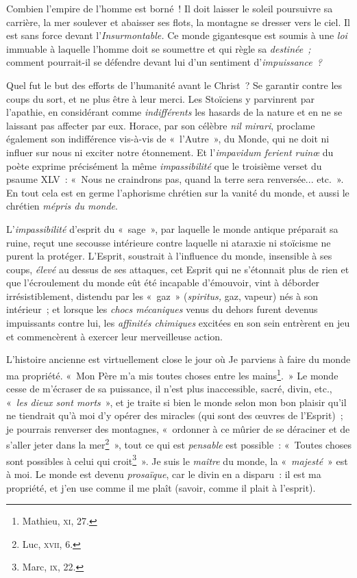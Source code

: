 \documentclass[french,twoside]{book} %
\begin{document}
\noindent Combien l’empire de l’homme est borné ! Il doit laisser le soleil poursuivre sa carrière, la mer soulever et abaisser ses flots, la montagne se dresser vers le ciel. Il est sans force devant l’\emph{Insurmontable.} Ce monde gigantesque est soumis à une \emph{loi} immuable à laquelle l’homme doit se soumettre et qui règle sa \emph{destinée ;} comment pourrait-il se défendre devant lui d’un sentiment d’\emph{impuissance ?}\par
Quel fut le but des efforts de l’humanité avant le  Christ ? Se garantir contre les coups du sort, et ne plus être à leur merci. Les Stoïciens y parvinrent par l’apathie, en considérant comme \emph{indifférents} les hasards de la nature et en ne se laissant pas affecter par eux. Horace, par son célèbre \emph{nil mirari}, proclame également son indifférence vis-à-vis de « l’Autre », du Monde, qui ne doit ni influer sur nous ni exciter notre étonnement. Et l’\emph{impavidum ferient ruinœ} du poète exprime précisément la même \emph{impassibilité} que le troisième verset du psaume XLV : « Nous ne craindrons pas, quand la terre sera renversée... etc. ». En tout cela est en germe l’aphorisme chrétien sur la vanité du monde, et aussi le chrétien \emph{mépris du monde}.\par
L’\emph{impassibilité} d’esprit du « sage », par laquelle le monde antique préparait sa ruine, reçut une secousse intérieure contre laquelle ni ataraxie ni stoïcisme ne purent la protéger. L’Esprit, soustrait à l’influence du monde, insensible à ses coups, \emph{élevé} au dessus de ses attaques, cet Esprit qui ne s’étonnait plus de rien et que l’écroulement du monde eût été incapable d’émouvoir, vint à déborder irrésistiblement, distendu par les « gaz » (\emph{spiritus,} gaz, vapeur) nés à son intérieur ; et lorsque les \emph{chocs mécaniques} venus du dehors furent devenus impuissants contre lui, les \emph{affinités chimiques} excitées en son sein entrèrent en jeu et commencèrent à exercer leur merveilleuse action.\par
L’histoire ancienne est virtuellement close le jour où Je parviens à faire du monde ma propriété. « Mon Père m’a mis toutes choses entre les mains\footnote{ \noindent Mathieu, {\scshape xi}, 27.
 }. » Le monde cesse de m’écraser de sa puissance, il n’est plus inaccessible, sacré, divin, etc., « \emph{les dieux sont morts} », et je traite si bien le monde selon mon bon plaisir qu’il ne tiendrait qu’à moi d’y opérer des miracles (qui sont des œuvres de l’Esprit) ; je pourrais renverser des montagnes, « ordonner à ce mûrier de se déraciner et de s’aller jeter dans la  mer\footnote{ \noindent Luc, {\scshape xvii}, 6.
 } », tout ce qui est \emph{pensable} est possible : « Toutes choses sont possibles à celui qui croit\footnote{ \noindent Marc, {\scshape ix}, 22.
 } ». Je suis le \emph{maître} du monde, la « \emph{majesté} » est à moi. Le monde est devenu \emph{prosaïque}, car le divin en a disparu : il est ma propriété, et j’en use comme il me plaît (savoir, comme il plait à l’esprit).\par
\end{document}
